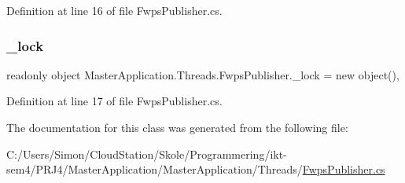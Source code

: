 Definition at line 16 of file Fwps\+Publisher.\+cs.

\mbox{\label{class_master_application_1_1_threads_1_1_fwps_publisher_a90b87f7a5031791824049034892a4274}} 
\subsubsection{\texorpdfstring{\+\_\+lock}{\_lock}}
{\footnotesize\ttfamily readonly object Master\+Application.\+Threads.\+Fwps\+Publisher.\+\_\+lock = new object()\hspace{0.3cm}{\ttfamily [static]}, {\ttfamily [private]}}



Definition at line 17 of file Fwps\+Publisher.\+cs.



The documentation for this class was generated from the following file\+:\begin{DoxyCompactItemize}
\item 
C\+:/\+Users/\+Simon/\+Cloud\+Station/\+Skole/\+Programmering/ikt-\/sem4/\+P\+R\+J4/\+Master\+Application/\+Master\+Application/\+Threads/\mbox{\hyperlink{_fwps_publisher_8cs}{Fwps\+Publisher.\+cs}}\end{DoxyCompactItemize}
